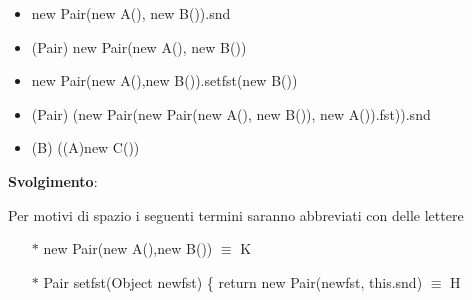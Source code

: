 \begin{itemize}
\item new Pair(new A(), new B()).snd
\item (Pair) new Pair(new A(), new B())
\item new Pair(new A(),new B()).setfst(new B())
\item (Pair) (new Pair(new Pair(new A(), new B()), new A()).fst)).snd
\item (B) ((A)new C())
\end{itemize}

\vspace{0,5cm}
\textbf{Svolgimento}:

Per motivi di spazio i seguenti termini saranno abbreviati con delle lettere
\begin{itemize}
\item[$\ast$] new Pair(new A(),new B()) $\equiv$ K
\item[$\ast$] Pair setfst(Object newfst) \{ return new Pair(newfst, this.snd) $\equiv$ H 
\end{itemize}

\vspace{0,5cm}

